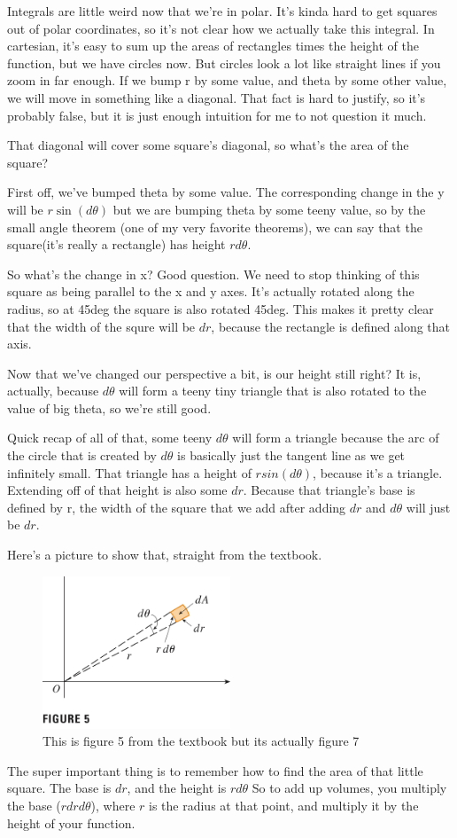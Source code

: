 \documentclass[12pt, letterpaper]{article}
\begin{document}
Integrals are little weird now that we're in polar. 
It's kinda hard to get squares out of polar coordinates, so it's not clear how we actually take this integral.
In cartesian, it's easy to sum up the areas of rectangles times the height of the function, but we have circles now.
But circles look a lot like straight lines if you zoom in far enough.
If we bump r by some value, and theta by some other value, we will move in something like a diagonal.
That fact is hard to justify, so it's probably false, but it is just enough intuition for me to not question it much.

That diagonal will cover some square's diagonal, so what's the area of the square?

First off, we've bumped theta by some value. 
The corresponding change in the y will be $r\sin(d\theta)$ but we are bumping theta by some teeny value, so by the small angle theorem (one of my very favorite theorems),
we can say that the square(it's really a rectangle) has height $rd\theta$.

So what's the change in x?
Good question. We need to stop thinking of this square as being parallel to the x and y axes.
It's actually rotated along the radius, so at 45deg the square is also rotated 45deg.
This makes it pretty clear that the width of the squre will be $dr$, because the rectangle is defined along that axis.

Now that we've changed our perspective a bit, is our height still right?
It is, actually, because $d\theta$ will form a teeny tiny triangle that is also rotated to the value of big theta, so we're still good.

Quick recap of all of that, some teeny $d\theta$ will form a triangle because the arc of the circle that is created by $d\theta$ is basically just the tangent line as we get infinitely small.
That triangle has a height of $rsin(d\theta)$, because it's a triangle.
Extending off of that height is also some $dr$. Because that triangle's base is defined by r, the width of the square that we add after adding $dr$ and $d\theta$ will just be $dr$.

Here's a picture to show that, straight from the textbook.
\begin{figure}[h]
    \centering 
    \includegraphics[width=0.5\textwidth]{polarIntegral}
    \caption{This is figure 5 from the textbook but its actually figure 7}
\end{figure}
The super important thing is to remember how to find the area of that little square.
The base is $dr$, and the height is $rd\theta$
So to add up volumes, you multiply the base ($rdrd\theta$), where $r$ is the radius at that point, and multiply it by the height of your function.
\end{document}
